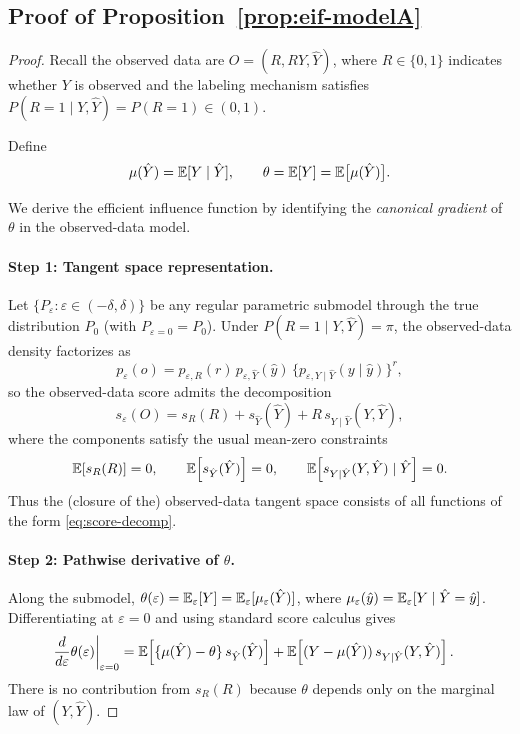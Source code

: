 \subsection{Proof of Proposition~\ref{prop:eif-modelA}}
\begin{proof}
Recall the observed data are $O=(R,RY,\hat Y)$, where $R\in\{0,1\}$ indicates whether $Y$ is observed and the labeling mechanism satisfies $P(R=1\mid Y,\hat Y)=P(R=1)\in(0,1)$.  

Define
\[
\mu(\hat Y)=\mathbb{E}[Y\mid \hat Y],\qquad \theta=\mathbb{E}[Y]=\mathbb{E}\bigl[\mu(\hat Y)\bigr].
\]

We derive the efficient influence function by identifying the \emph{canonical gradient} of $\theta$ in the
observed-data model.

\paragraph{Step 1: Tangent space representation.}
Let $\{P_\varepsilon:\varepsilon\in(-\delta,\delta)\}$ be any regular parametric submodel through the true distribution $P_0$
(with $P_{\varepsilon=0}=P_0$). Under $P(R=1\mid Y,\hat Y)=\pi$, the observed-data density factorizes as
\[
p_\varepsilon(o)
=
p_{\varepsilon,R}(r)\,p_{\varepsilon,\hat Y}(\hat y)\,
\bigl\{p_{\varepsilon,Y\mid \hat Y}(y\mid \hat y)\bigr\}^{r},
\]
so the observed-data score admits the decomposition
\begin{equation}
\label{eq:score-decomp}
s_\varepsilon(O)
=
s_R(R)+s_{\hat Y}(\hat Y)+R\,s_{Y\mid \hat Y}(Y,\hat Y),
\end{equation}
where the components satisfy the usual mean-zero constraints
\[
\mathbb{E}\!\left[s_R(R)\right]=0,\qquad
\mathbb{E}\!\left[s_{\hat Y}(\hat Y)\right]=0,\qquad
\mathbb{E}\!\left[s_{Y\mid \hat Y}(Y,\hat Y)\mid \hat Y\right]=0.
\]
Thus the (closure of the) observed-data tangent space consists of all functions of the form
\eqref{eq:score-decomp}.

\paragraph{Step 2: Pathwise derivative of $\theta$.}
Along the submodel, $\theta(\varepsilon)=\mathbb{E}_\varepsilon[Y]=\mathbb{E}_\varepsilon[\mu_\varepsilon(\hat Y)]$, where
$\mu_\varepsilon(\hat y)=\mathbb{E}_\varepsilon[Y\mid \hat Y=\hat y]$.
Differentiating at $\varepsilon=0$ and using standard score calculus gives
\begin{align}
\left.\frac{d}{d\varepsilon}\theta(\varepsilon)\right|_{\varepsilon=0}
&=
\mathbb{E}\!\left[\{\mu(\hat Y)-\theta\}\,s_{\hat Y}(\hat Y)\right]
+
\mathbb{E}\!\left[(Y-\mu(\hat Y))\,s_{Y\mid \hat Y}(Y,\hat Y)\right].
\label{eq:pathwise-deriv}
\end{align}
There is no contribution from $s_R(R)$ because $\theta$ depends only on the marginal law of $(Y,\hat Y)$.


\end{proof}
